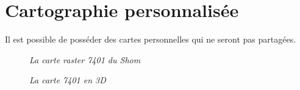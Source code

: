 \section{Cartographie personnalisée}
Il est possible de posséder des cartes personnelles qui ne seront pas partagées.
\begin{center}
\begin{figure}[ht]
\caption{\label{equiProj}\textit{La carte raster 7401 du Shom}}
\end{figure}
\end{center}
\begin{center}
\begin{figure}[ht]
\caption{\label{equiProj}\textit{La carte 7401 en 3D}}
\end{figure}
\end{center}
